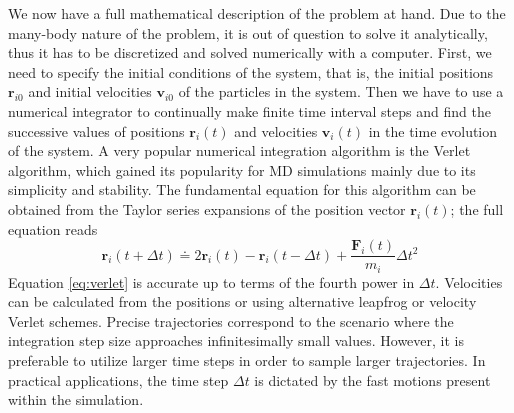 We now have a full mathematical description of the problem at hand. Due to the
many-body nature of the problem, it is out of question to solve it
analytically, thus it has to be discretized and solved numerically with a
computer. First, we need to specify the initial conditions of the system,
that is, the initial positions $\mathbf{r}_{i0}$ and initial velocities
$\mathbf{v}_{i0}$ of the particles in the system. Then we have to use a
numerical integrator to continually make finite time interval steps and find
the successive values of positions $\mathbf{r}_i(t)$ and velocities
$\mathbf{v}_{i}(t)$ in the time evolution of the system. A very popular
numerical integration algorithm is the Verlet algorithm, which gained its
popularity for MD simulations mainly due to its simplicity and stability.
The fundamental equation for this algorithm can be obtained from the Taylor
series expansions of the position vector $\mathbf{r}_i(t)$; the full equation
reads
\begin{equation}
  \mathbf{r}_i (t + \Delta t) \doteq 2 \mathbf{r}_i(t)
    - \mathbf{r}_i(t - \Delta t) + \frac{\mathbf{F}_i(t)}{m_i} \Delta t^2
  \label{eq:verlet}
\end{equation}
Equation \eqref{eq:verlet} is accurate up to terms of the fourth power in
$\Delta t$. Velocities can be calculated from the positions or using
alternative leapfrog or velocity Verlet schemes. Precise trajectories
correspond to the scenario where the integration step size approaches
infinitesimally small values. However, it is preferable to utilize larger time
steps in order to sample larger trajectories. In practical applications, the
time step $\Delta t$ is dictated by the fast motions present within the
simulation.

